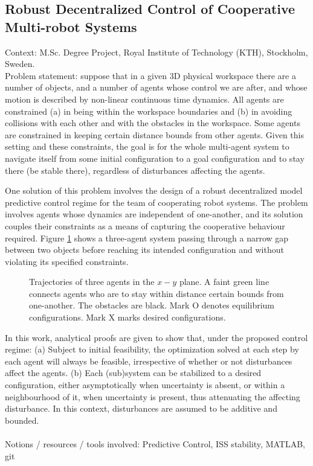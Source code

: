 \subsection{Robust Decentralized Control of Cooperative Multi-robot Systems}

Context: M.Sc. Degree Project, Royal Institute of Technology (KTH), Stockholm, Sweden.\\

Problem statement: suppose that in a given 3D physical workspace there are
a number of objects, and a number of agents whose control we are after, and
whose motion is described by non-linear continuous time dynamics. All agents
are constrained (a) in being within the workspace boundaries and (b) in avoiding
collisions with each other and with the obstacles in the workspace. Some agents
are constrained in keeping certain distance bounds from other agents. Given this
setting and these constraints, the goal is for the whole multi-agent system to
navigate itself from some initial configuration to a goal configuration and to
stay there (be stable there), regardless of disturbances affecting the agents.

One solution of this problem involves the design of a robust decentralized model
predictive control regime for the team of cooperating robot systems. The problem
involves agents whose dynamics are independent of one-another, and its solution
couples their constraints as a means of capturing the cooperative behaviour required.
Figure \ref{fig:d_OFF_res_trajectory_3_2} shows a three-agent system passing
through a narrow gap between two objects before reaching its intended
configuration and without violating its specified constraints.

\begin{figure}[H]\centering
  \scalebox{0.8}{}
  \caption{Trajectories of three agents in the $x-y$ plane. A faint green line
    connects agents who are to stay within distance certain bounds from
    one-another. The obstacles are black. Mark O denotes equilibrium
    configurations. Mark X marks desired configurations.}
  \label{fig:d_OFF_res_trajectory_3_2}
\end{figure}



In this work, analytical proofs are given to show that, under the proposed
control regime: (a) Subject to initial feasibility, the optimization solved at
each step by each agent will always be feasible, irrespective of whether or not
disturbances affect the agents. (b) Each (sub)system can be stabilized to a
desired configuration, either asymptotically when uncertainty is absent,
or within a neighbourhood of it, when uncertainty is present, thus attenuating
the affecting disturbance. In this context, disturbances are assumed to be
additive and bounded.\\\\
Notions / resources / tools involved: Predictive Control, ISS stability, MATLAB, git
